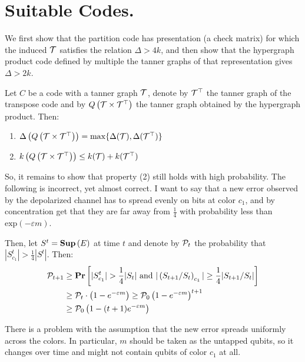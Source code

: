 \documentclass[manuscript,screen,review]{acmart}
\begin{document}
\section{Suitable Codes.}  
We first show that the partition code has presentation (a check matrix) for which the induced $\mathcal{T}$ satisfies the relation $\Delta > 4k$, and then show that the hypergraph product code defined by multiple the tanner graphs of that representation gives $\Delta > 2k$.

\begin{claim}
  Let $C$ be a code with a tanner graph $\mathcal{T}$, denote by $\mathcal{T}^\top$ the tanner graph of the transpose code and by $Q\left(\mathcal{T} \times \mathcal{T}^\top\right) $ the tanner graph obtained by the hypergraph product. Then:  
  \begin{enumerate}
    \item $ \Delta\left(Q\left(\mathcal{T} \times \mathcal{T}^\top\right)\right) = \max \{  \Delta(\mathcal{T}), \Delta(\mathcal{T}^{\top}) \} $ 
    \item $ k\left(Q\left(\mathcal{T} \times \mathcal{T}^\top\right)\right) \le  k(\mathcal{T}) + k(\mathcal{T}^{\top})$ 
  \end{enumerate}
\end{claim}



So, it remains to show that property (2) still holds with high probability. The following is incorrect, yet almost correct. I want to say that a new error observed by the depolarized channel has to spread evenly on bits at color $c_{1}$, and by concentration get that they are far away from $\frac{1}{4}$ with probability less than $\text{exp}( - \varepsilon m )$.

Then, let $S^{t} = \mathbf{Sup} \left(E\right) $ at time $t$ and denote by $\mathcal{P}_{t}$ the probability that $|S^{t}_{c_{1}}| > \frac{1}{4}|S^{t}|$. Then:
\begin{equation*}
  \begin{split}
    \mathcal{P}_{t+1} &\ge \mathbf{Pr} \left[  |S^{t}_{c_{1}}| > \frac{1}{4}|S_{t}| \text{ and }  | \left( S_{t+1}/S_{t} \right)_{c_1}  | \ge \frac{1}{4}|S_{t+1}/S_{t}|   \right]  \\
    &\ge \mathcal{P}_{t} \cdot \left( 1 - e^{- \varepsilon m}   \right) \ge \mathcal{P}_{0}\left( 1 - e^{- \varepsilon m } \right)^{t+1} \\ 
    & \ge \mathcal{P}_{0}\left( 1 - (t+1) e^{- \varepsilon m } \right)
  \end{split}
\end{equation*}

There is a problem with the assumption that the new error spreads uniformly across the colors. In particular, $m$ should be taken as the untapped qubits, so it changes over time and might not contain qubits of color $c_{1}$ at all.
\end{document}
